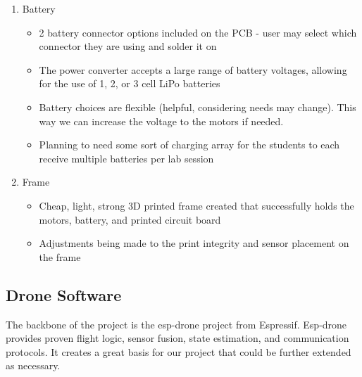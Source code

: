 \documentclass[12pt, titlepage]{article}
\begin{document}
\begin{enumerate}
\item Battery
\begin{itemize}
\item 2 battery connector options included on the PCB - user may select which connector they are using and solder it on
\item The power converter accepts a large range of battery voltages, allowing for the use of 1, 2, or 3 cell LiPo batteries
\item Battery choices are flexible (helpful, considering needs may change). This way we can increase the voltage to the motors if needed.
\item Planning to need some sort of charging array for the students to each receive multiple batteries per lab session
\end{itemize}

\item Frame
\begin{itemize}
\item Cheap, light, strong 3D printed frame created that successfully holds the motors, battery, and printed circuit board
\item Adjustments being made to the print integrity and sensor placement on the frame
\end{itemize}

\end{enumerate}

\subsection{Drone Software}
The backbone of the project is the esp-drone project from Espressif. Esp-drone provides proven flight logic, sensor fusion, state estimation, and communication protocols. It creates a great basis for our project that could be further extended as necessary. 
\end{document}
